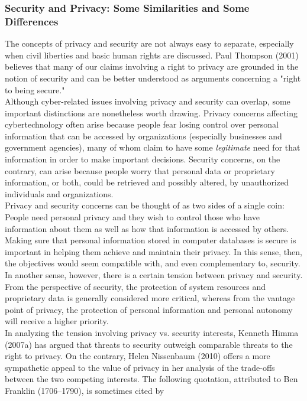 \documentclass[12pt]{article}
\theoremstyle{definition}
\begin{document}
\subsubsection{Security and Privacy: Some Similarities and Some Differences}
The concepts of privacy and security are not always easy to separate, especially when civil
liberties and basic human rights are discussed. Paul Thompson (2001) believes that many of our claims involving a right to privacy are grounded in the notion of security and can be better understood as
arguments concerning a "right to being secure."\\
Although cyber-related issues involving privacy and security can overlap, some
important distinctions are nonetheless worth drawing. Privacy concerns affecting cybertechnology
often arise because people fear losing control over personal information that
can be accessed by organizations (especially businesses and government agencies), many
of whom claim to have some \textit{legitimate} need for that information in order to make
important decisions. Security concerns, on the contrary, can arise because people worry
that personal data or proprietary information, or both, could be retrieved and possibly
altered, by unauthorized individuals and organizations.\\
Privacy and security concerns can be thought of as two sides of a single coin: People
need personal privacy and they wish to control those who have information about them as
well as how that information is accessed by others. Making sure that personal information
stored in computer databases is secure is important in helping them achieve and maintain
their privacy. In this sense, then, the objectives would seem compatible with, and even
complementary to, security. In another sense, however, there is a certain tension between
privacy and security. From the perspective of security, the protection of system resources
and proprietary data is generally considered more critical, whereas from the vantage
point of privacy, the protection of personal information and personal autonomy will
receive a higher priority.\\
In analyzing the tension involving privacy vs. security interests, Kenneth Himma
(2007a) has argued that threats to security outweigh comparable threats to the right to
privacy. On the contrary, Helen Nissenbaum (2010) offers a more sympathetic appeal to
the value of privacy in her analysis of the trade-offs between the two competing interests.
The following quotation, attributed to Ben Franklin (1706–1790), is sometimes cited by
\end{document}
